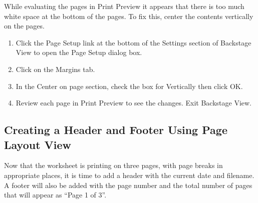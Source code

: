 While evaluating the pages in Print Preview it appears that there is too much white space at the bottom of the pages. To fix this, center the contents vertically on the pages.

\begin{enumerate}
	\item Click the Page Setup link at the bottom of the Settings section of Backstage View to open the Page Setup dialog box.
	\item Click on the Margins tab.
	\item In the Center on page section, check the box for Vertically then click OK.
	\item Review each page in Print Preview to see the changes. Exit Backstage View.
\end{enumerate}

\subsection{Creating a Header and Footer Using Page Layout View}

Now that the worksheet is printing on three pages, with page breaks in appropriate places, it is time to add a header with the current date and filename. A footer will also be added with the page number and the total number of pages that will appear as ``Page 1 of 3''. 

